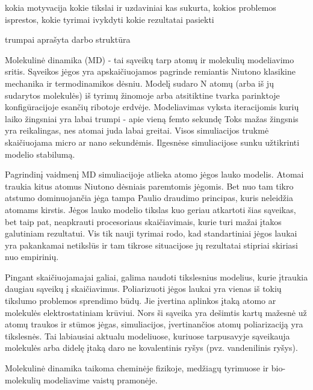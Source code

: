 kokia motyvacija
kokie tikslai ir uzdaviniai
kas sukurta, kokios problemos isprestos, kokie tyrimai ivykdyti
kokie rezultatai pasiekti

trumpai aprašyta darbo struktūra

Molekulinė dinamika (MD) - tai sąveikų tarp atomų ir molekulių modeliavimo sritis.
Sąveikos jėgos yra apskaičiuojamos pagrinde remiantis Niutono klasikine mechanika ir termodinamikos dėsniu.
Modelį sudaro N atomų (arba iš jų sudarytos molekulės) iš tyrimų žinomoje arba atsitiktine tvarka parinktoje konfigūracijoje esančių ribotoje erdvėje.
Modeliavimas vyksta iteracijomis kurių laiko žingsniai yra labai trumpi - apie vieną femto sekundę
Toks mažas žingsnis yra reikalingas, nes atomai juda labai greitai.
Visos simuliacijos trukmė skaičiuojama micro ar nano sekundėmis.
Ilgesnėse simuliacijose sunku užtikrinti modelio stabilumą.

Pagrindinį vaidmenį MD simuliacijoje atlieka atomo jėgos lauko modelis.
Atomai traukia kitus atomus Niutono dėsniais paremtomis jėgomis.
Bet nuo tam tikro atstumo dominuojančia jėga tampa Paulio draudimo principas, kuris neleidžia atomams kirstis.
Jėgos lauko modelio tikslas kuo geriau atkartoti šias sąveikas, bet taip pat, neapkrauti procesoriaus skaičiavimais, kurie turi mažai įtakos galutiniam rezultatui.
Vis tik nauji tyrimai rodo, kad standartiniai jėgos laukai yra pakankamai netikslūs ir tam tikrose situacijose jų rezultatai stipriai skiriasi nuo empirinių.

Pingant skaičiuojamajai galiai, galima naudoti tikslesnius modelius, kurie įtraukia daugiau sąveikų į skaičiavimus.
Poliarizuoti jėgos laukai yra vienas iš tokių tikslumo problemos sprendimo būdų.
Jie įvertina aplinkos įtaką atomo ar molekulės elektrostatiniam krūviui.
Nors ši sąveika yra dešimtis kartų mažesnė už atomų traukos ir stūmos jėgas, simuliacijos, įvertinančios atomų poliarizaciją yra tikslesnės.
Tai labiausiai aktualu modeliuose, kuriuose tarpusavyje sąveikauja molekulės arba didelę įtaką daro ne kovalentinis ryšys (pvz. vandenilinis ryšys).

Molekulinė dinamika taikoma cheminėje fizikoje, medžiagų tyrimuose ir bio-molekulių modeliavime vaistų pramonėje.
